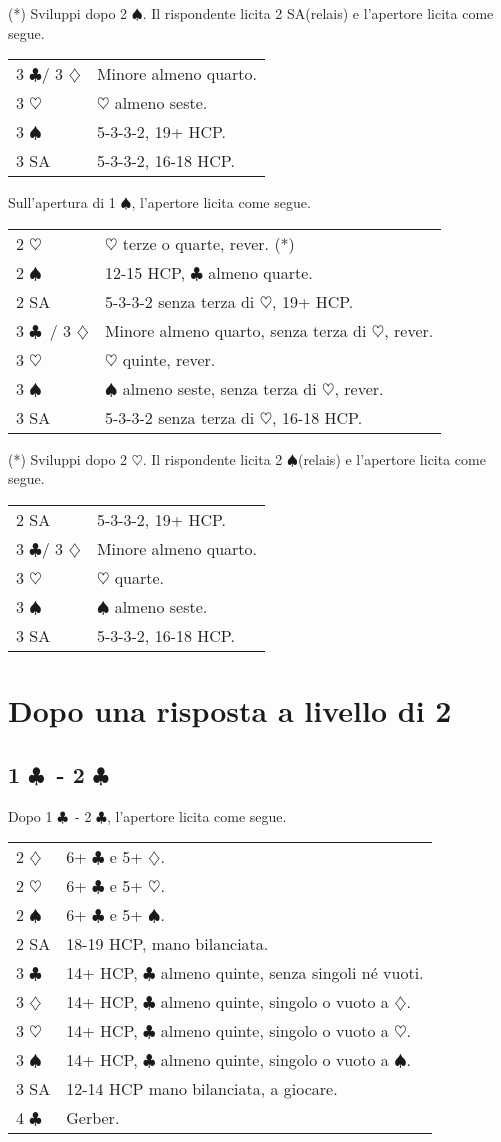 \documentclass[a4paper,10pt]{article}
\renewcommand{\c}{$\clubsuit$\xspace}
\renewcommand{\d}{$\diamondsuit$\xspace}
\newcommand{\h}{$\heartsuit$\xspace}
\newcommand{\s}{$\spadesuit$\xspace}
\newcommand{\sa}{SA\xspace}
\newcommand{\smallspace}{\vskip0.3cm}
\newenvironment{twocol}
  {\smallspace\noindent\begin{tabular}{l p{0.78\textwidth}}}
  {\end{tabular}\smallspace}
\begin{document}
\noindent (*) Sviluppi dopo 2 \s. Il rispondente licita 2 \sa (relais) e l'apertore licita come segue.
\begin{twocol}
  3 \c / 3 \d & Minore almeno quarto. \\
  3 \h & \h almeno seste. \\
  3 \s & 5-3-3-2, 19+ HCP. \\
  3 \sa & 5-3-3-2, 16-18 HCP.
\end{twocol}


\noindent Sull'apertura di 1 \s, l'apertore licita come segue.

\begin{twocol}
  2 \h & \h terze o quarte, rever. (*)\\
  2 \s & 12-15 HCP, \c almeno quarte. \\
  2 \sa & 5-3-3-2 senza terza di \h, 19+ HCP. \\
  3 \c\ / 3 \d & Minore almeno quarto, senza terza di \h, rever. \\
  3 \h & \h quinte, rever. \\
  3 \s & \s almeno seste, senza terza di \h, rever. \\
  3 \sa & 5-3-3-2 senza terza di \h, 16-18 HCP.
\end{twocol}

\noindent (*) Sviluppi dopo 2 \h. Il rispondente licita 2 \s (relais) e l'apertore licita come segue.
\begin{twocol}
  2 \sa & 5-3-3-2, 19+ HCP. \\
  3 \c / 3 \d & Minore almeno quarto. \\
  3 \h & \h quarte. \\
  3 \s & \s almeno seste. \\
  3 \sa & 5-3-3-2, 16-18 HCP.
\end{twocol}


\section{Dopo una risposta a livello di 2}

\subsection{1 \c\ - 2 \c}

Dopo 1 \c\ - 2 \c, l'apertore licita come segue.

\begin{twocol}
	2 \d & 6+ \c e 5+ \d. \\
	2 \h & 6+ \c e 5+ \h. \\
	2 \s & 6+ \c e 5+ \s. \\
	2 SA & 18-19 HCP, mano bilanciata. \\
	3 \c & 14+ HCP, \c almeno quinte, senza singoli né vuoti. \\
	3 \d & 14+ HCP, \c almeno quinte, singolo o vuoto a \d.\\
	3 \h & 14+ HCP, \c almeno quinte, singolo o vuoto a \h.\\
	3 \s & 14+ HCP, \c almeno quinte, singolo o vuoto a \s.\\
	3 \sa & 12-14 HCP mano bilanciata, a giocare.\\
	4 \c & Gerber.
\end{twocol}
\end{document}

